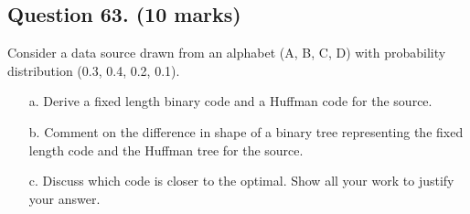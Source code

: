 \subsection*{Question 63. (10 marks) } Consider a data source drawn from an alphabet (A, B, C, D) with probability
distribution (0.3, 0.4, 0.2, 0.1).
\begin{itemize}
	\item[a.] Derive a fixed length binary code and a Huffman code for the source.
	\item[b.] Comment on the difference in shape of a binary tree representing the fixed
	length code and the Huffman tree for the source.
	\item[c.] Discuss which code is closer to the optimal. Show all your work to justify your
	answer.
\end{itemize}